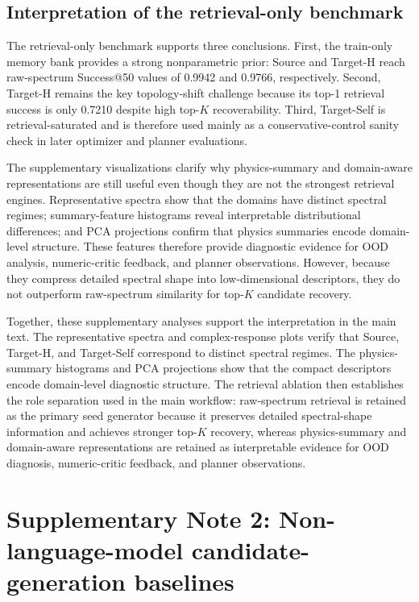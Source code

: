 \documentclass[final,1p,times]{elsarticle}
\begin{document}
\subsection{Interpretation of the retrieval-only benchmark}

The retrieval-only benchmark supports three conclusions. First, the train-only memory bank provides a strong nonparametric prior: Source and Target-H reach raw-spectrum Success@50 values of 0.9942 and 0.9766, respectively. Second, Target-H remains the key topology-shift challenge because its top-1 retrieval success is only 0.7210 despite high top-$K$ recoverability. Third, Target-Self is retrieval-saturated and is therefore used mainly as a conservative-control sanity check in later optimizer and planner evaluations.

The supplementary visualizations clarify why physics-summary and domain-aware representations are still useful even though they are not the strongest retrieval engines. Representative spectra show that the domains have distinct spectral regimes; summary-feature histograms reveal interpretable distributional differences; and PCA projections confirm that physics summaries encode domain-level structure. These features therefore provide diagnostic evidence for OOD analysis, numeric-critic feedback, and planner observations. However, because they compress detailed spectral shape into low-dimensional descriptors, they do not outperform raw-spectrum similarity for top-$K$ candidate recovery.

Together, these supplementary analyses support the interpretation in the main text. The representative spectra and complex-response plots verify that Source, Target-H, and Target-Self correspond to distinct spectral regimes. The physics-summary histograms and PCA projections show that the compact descriptors encode domain-level diagnostic structure. The retrieval ablation then establishes the role separation used in the main workflow: raw-spectrum retrieval is retained as the primary seed generator because it preserves detailed spectral-shape information and achieves stronger top-$K$ recovery, whereas physics-summary and domain-aware representations are retained as interpretable evidence for OOD diagnosis, numeric-critic feedback, and planner observations.




\section{Supplementary Note 2: Non-language-model candidate-generation baselines}
\end{document}
